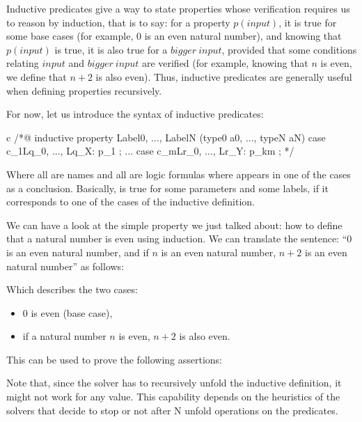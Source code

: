 Inductive predicates give a way to state properties whose verification requires
us to reason by induction, that is to say: for a property $p(input)$, it is true
for some base cases (for example, $0$ is an even natural number), and knowing
that $p(input)$ is true, it is also true for a $bigger\ input$, provided that
some conditions relating $input$ and $bigger\ input$ are verified (for example,
knowing that $n$ is even, we define that $n+2$ is also even). Thus, inductive
predicates are generally useful when defining properties recursively.


For now, let us introduce the syntax of inductive predicates:

\begin{CodeBlock}{c}
/*@
  inductive property{ Label0, ..., LabelN }(type0 a0, ..., typeN aN) {
  case c_1{Lq_0, ..., Lq_X}: p_1 ;
  ...
  case c_m{Lr_0, ..., Lr_Y}: p_km ;
  }
*/
\end{CodeBlock}

Where all  are names and all  are logic
formulas where  appears in one of the cases as a conclusion. Basically,
 is true for some parameters and some labels, if it
corresponds to one of the cases of the inductive definition.

We can have a look at the simple property we just talked about: how to define
that a natural number is even using induction. We can translate the sentence:
``0 is an even natural number, and if $n$ is an even natural number, $n+2$ is
an even natural number'' as follows:




Which describes the two cases:
\begin{itemize}
\item $0$ is even (base case),
\item if a natural number $n$ is even, $n+2$ is also even.
\end{itemize}


This can be used to prove the following assertions:




Note that, since the solver has to recursively unfold the inductive definition,
it might not work for any value. This capability depends on the heuristics of
the solvers that decide to stop or not after N unfold operations on the
predicates.


